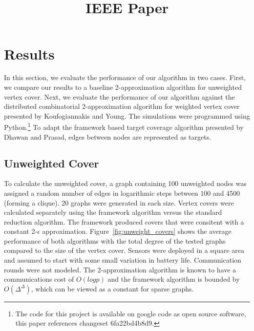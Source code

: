 \documentclass[conference, 11pt]{IEEEtran}
\theoremstyle{definition}
\begin{document}
\title{IEEE Paper} 

\author{
}

\maketitle

\begin{abstract}

\end{abstract}

\section{Results} 
In this section, we evaluate the performance of our algorithm in two cases. First, we compare our results to a baseline 2-approximation algorithm for unweighted vertex cover.\cite{500824} Next, we evaluate the performance of our algorithm against the distributed combinatorial 2-approximation algorithm for weighted vertex cover presented by Koufogiannakis and Young.\cite{1582746} The simulations were programmed using Python.\footnote{The code for this project is available on google code as open source software, this paper references changeset 6fa22bd4b8d9.} To adapt the framework based target coverage algorithm presented by Dhawan and Prasad\cite{IPDPS.2008.45361}, edges between nodes are represented as targets. 
\subsection{Unweighted Cover}
To calculate the unweighted cover, a graph containing 100 unweighted nodes was assigned a random number of edges in logarithmic steps between 100 and 4500 (forming a clique). 20 graphs were generated in each size. Vertex covers were calculated separately using the framework algorithm versus the standard reduction algorithm. The framework produced covers that were consitent with a constant 2-$\epsilon$ approximation. Figure~\ref{fig:unweight_covers} shows the average performance of both algorithms with the total degree of the tested graphs compared to the size of the vertex cover. Sensors were deployed in a square area and assumed to start with some small variation in battery life. Communication rounds were not modeled. The 2-approximation algorithm is known to have a communications cost of $O(log p)$ and the framework algorithm is bounded by $O(\Delta^\Delta)$, which can be viewed as a constant for sparse graphs.
\end{document}
